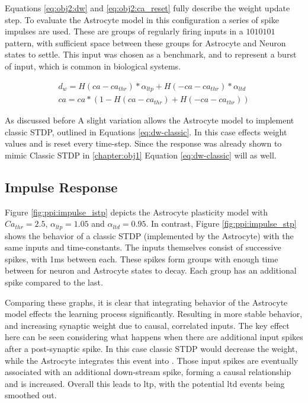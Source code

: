 Equations \ref{eq:obj2:dw} and \ref{eq:obj2:ca_reset} fully
describe the weight update step. To evaluate the Astrocyte
model in this configuration a series of spike impulses are used. These are
groups of regularly firing inputs in a $1010101$ pattern, with sufficient space
between these groups for Astrocyte and Neuron states to settle. This input was
chosen as a benchmark, and to represent a burst of input, which is common in
biological systems.

\begin{align}
  d_w = H(ca - ca_{thr}) * \alpha_{ltp} + H(-ca - ca_{thr}) *
  \alpha_{ltd} \label{eq:obj2:dw} \\
  ca = ca * (1 - H(ca - ca_{thr}) +  H(-ca - ca_{thr})) \label{eq:obj2:ca_reset}
\end{align}

As discussed before A slight variation allows the Astrocyte model to implement
classic STDP, outlined in Equations \ref{eq:dw-classic}. In this case \ca
effects weight values and is reset every time-step. Since the \ca response was
already shown to mimic Classic STDP in \ref{chapter:obj1} Equation
\ref{eq:dw-classic} will as well.

\subsection{Impulse Response}
Figure \ref{fig:ppi:impulse_istp} depicts the Astrocyte plasticity model with
$Ca_{thr}=2.5$, $\alpha_{ltp}=1.05$ and $\alpha_{ltd}=0.95$. In contrast, Figure
\ref{fig:ppi:impulse_stp} shows the behavior of a classic STDP (implemented by
the Astrocyte) with the same inputs and time-constants. The inputs themselves
consist of successive spikes, with 1ms between each. These spikes form groups
with enough time between for neuron and Astrocyte states to decay. Each group
has an additional spike compared to the last.

Comparing these graphs, it is clear that integrating
behavior of the Astrocyte model effects the learning process
significantly. Resulting in more stable behavior, and increasing synaptic weight
due to causal, correlated inputs. The key effect here can be seen considering
what happens when there are additional input spikes after a post-synaptic
spike. In this case classic STDP would decrease the weight, while the Astrocyte
integrates this event into \ca. Those input spikes are eventually associated
with an additional down-stream spike, forming a causal relationship and \ca is
increased. Overall this leads to \Gls{ltp}, with the potential \Gls{ltd} events being
smoothed out.

